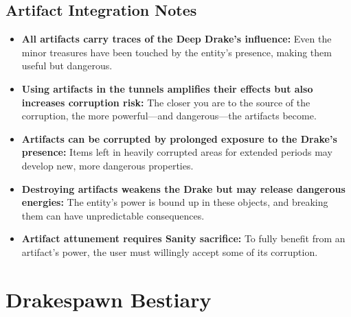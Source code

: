\documentclass[11pt]{article}
\begin{document}
\begin{itemize}
\subsection{Artifact Integration Notes}
\begin{itemize}
\item \textbf{All artifacts carry traces of the Deep Drake's influence:} Even the minor treasures have been touched by the entity's presence, making them useful but dangerous.
\item \textbf{Using artifacts in the tunnels amplifies their effects but also increases corruption risk:} The closer you are to the source of the corruption, the more powerful—and dangerous—the artifacts become.
\item \textbf{Artifacts can be corrupted by prolonged exposure to the Drake's presence:} Items left in heavily corrupted areas for extended periods may develop new, more dangerous properties.
\item \textbf{Destroying artifacts weakens the Drake but may release dangerous energies:} The entity's power is bound up in these objects, and breaking them can have unpredictable consequences.
\item \textbf{Artifact attunement requires Sanity sacrifice:} To fully benefit from an artifact's power, the user must willingly accept some of its corruption.
\end{itemize}

\section{Drakespawn Bestiary}


\end{itemize}
\end{document}
